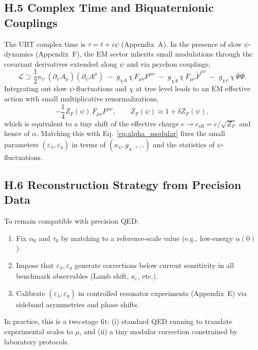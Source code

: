 \subsection*{H.5 Complex Time and Biquaternionic Couplings}
The UBT complex time is $\tau=t+i\psi$ (Appendix~A). 
In the presence of slow $\psi$-dynamics (Appendix~F), the EM sector inherits small modulations through the covariant derivatives extended along $\psi$ and via psychon couplings,
\begin{equation}
\mathcal{L} \supset \frac{1}{2}\kappa_\psi\,(\partial_\psi A_\mu)(\partial_\psi A^\mu) \;-\; g_{\chi A}\,\chi\,F_{\mu\nu}F^{\mu\nu} \;-\; g_{\chi\tilde A}\,\chi\,F_{\mu\nu}\tilde F^{\mu\nu} \;-\; g_{\chi \psi}\,\chi\,\bar{\Psi}\Psi.
\end{equation}
Integrating out slow $\psi$-fluctuations and $\chi$ at tree level leads to an EM effective action with small multiplicative renormalizations,
\begin{equation}
-\frac{1}{4} Z_F(\psi)\,F_{\mu\nu}F^{\mu\nu}, 
\qquad Z_F(\psi) \approx 1 + \delta Z_F(\psi),
\end{equation}
which is equivalent to a tiny shift of the effective charge $e \to e_{\mathrm{eff}}=e/\sqrt{Z_F}$ and hence of $\alpha$. 
Matching this with Eq.~\eqref{eq:alpha_modular} fixes the small parameters $(\varepsilon_\lambda,\varepsilon_\eta)$ in terms of $(\kappa_\psi,g_{\chi\cdot},\ldots)$ and the statistics of $\psi$-fluctuations.

\subsection*{H.6 Reconstruction Strategy from Precision Data}
To remain compatible with precision QED:
\begin{enumerate}
\item Fix $\alpha_0$ and $\tau_0$ by matching to a reference-scale value (e.g., low-energy $\alpha(0)$).
\item Impose that $\varepsilon_{\lambda},\varepsilon_{\eta}$ generate corrections below current sensitivity in all benchmark observables (Lamb shift, $a_e$, etc.).
\item Calibrate $(\varepsilon_{\lambda},\varepsilon_{\eta})$ in controlled resonator experiments (Appendix~E) via sideband asymmetries and phase shifts.
\end{enumerate}
In practice, this is a two-stage fit: (i) standard QED running to translate experimental scales to $\mu$, and (ii) a tiny modular correction constrained by laboratory protocols.

